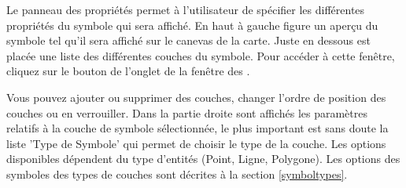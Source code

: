 

Le panneau des propriétés permet à l'utilisateur de spécifier les différentes 
propriétés du symbole qui sera affiché. En haut à gauche figure un aperçu du 
symbole tel qu'il sera affiché sur le canevas de la carte. Juste en dessous est 
placée une liste des différentes couches du symbole. Pour accéder à cette fenêtre, 
cliquez sur le bouton  de l'onglet 
 de la fenêtre des .


Vous pouvez ajouter ou supprimer des couches, changer l'ordre de position des 
couches ou en verrouiller. Dans la partie droite sont affichés les paramètres 
relatifs à la couche de symbole sélectionnée, le plus important est sans doute 
la liste 'Type de Symbole' qui permet de choisir le type de la couche. Les options 
disponibles dépendent du type d'entités (Point, Ligne, Polygone). Les options des 
symboles des types de couches sont décrites à la section \ref{symboltypes}.

